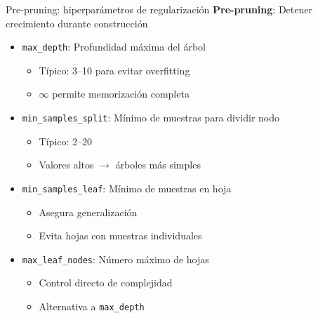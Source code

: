 \documentclass[aspectratio=169,12pt]{beamer}
\begin{document}
\begin{frame}{Pre-pruning: hiperparámetros de regularización}
  \small
  \textbf{Pre-pruning}: Detener crecimiento durante construcción
  \begin{itemize}
    \item \texttt{max\_depth}: Profundidad máxima del árbol
    \begin{itemize}\scriptsize
      \item Típico: 3--10 para evitar overfitting
      \item $\infty$ permite memorización completa
    \end{itemize}
    \item \texttt{min\_samples\_split}: Mínimo de muestras para dividir nodo
    \begin{itemize}\scriptsize
      \item Típico: 2--20
      \item Valores altos $\rightarrow$ árboles más simples
    \end{itemize}
    \item \texttt{min\_samples\_leaf}: Mínimo de muestras en hoja
    \begin{itemize}\scriptsize
      \item Asegura generalización
      \item Evita hojas con muestras individuales
    \end{itemize}
    \item \texttt{max\_leaf\_nodes}: Número máximo de hojas
    \begin{itemize}\scriptsize
      \item Control directo de complejidad
      \item Alternativa a \texttt{max\_depth}
    \end{itemize}
  \end{itemize}
\end{frame}
\end{document}
